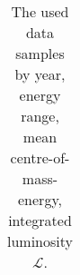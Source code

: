 {\begin{table}[htbp]
\begin{tabular}{|c|c|c|c|}
\hline
\end{tabular}
\caption{The used data samples by year, energy range, mean centre-of-mass-energy, integrated luminosity ${\mathcal L}$.}
\label{tab:luminocity}
\end{table}
}




\newcommand{\TABmontecarlo}{
\begin{table}[htbp]\centering
\begin{tabular}{|c|c|c|c|c|}\hline
$\sqrt{s},\GeV$       &  Pythia~6.1 & Herwig~6.2 & KoralW~1.42 & KoralW~1.42  \\
& $e^+e^-\rightarrow Z/\gamma,$     & $e^+e^-\rightarrow Z/\gamma,$     &  $e^+e^-\rightarrow W^+W^-,$ &  $e^+e^-\rightarrow W^+W^-,$ \\
& $Z/\gamma\rightarrow \mathrm{hadrons}$ & $Z/\gamma\rightarrow \mathrm{hadrons}$ &  $W^+W^-\rightarrow qqqq$ &  $W^+W^-\rightarrow qqll$ \\
\hline\hline
 $130.1$ & & & &  \\
\hline
\end{tabular}
\caption{
A summary on the used Monte Carlo samples.
}
\label{tab:montecarlo}
\end{table}
}




